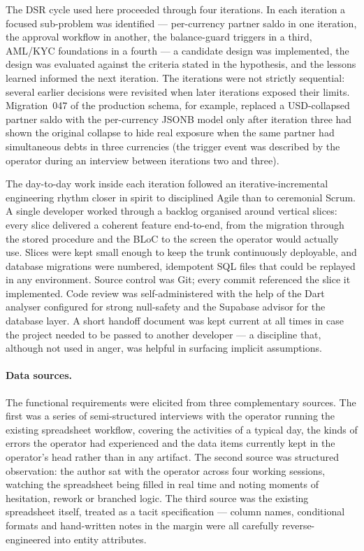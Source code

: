 The DSR cycle used here proceeded through four iterations. In each iteration a focused sub-problem was identified --- per-currency partner saldo in one iteration, the approval workflow in another, the balance-guard triggers in a third, AML/KYC foundations in a fourth --- a candidate design was implemented, the design was evaluated against the criteria stated in the hypothesis, and the lessons learned informed the next iteration. The iterations were not strictly sequential: several earlier decisions were revisited when later iterations exposed their limits. Migration~047 of the production schema, for example, replaced a USD-collapsed partner saldo with the per-currency JSONB model only after iteration three had shown the original collapse to hide real exposure when the same partner had simultaneous debts in three currencies (the trigger event was described by the operator during an interview between iterations two and three).

The day-to-day work inside each iteration followed an iterative-incremental engineering rhythm closer in spirit to disciplined Agile than to ceremonial Scrum. A single developer worked through a backlog organised around vertical slices: every slice delivered a coherent feature end-to-end, from the migration through the stored procedure and the BLoC to the screen the operator would actually use. Slices were kept small enough to keep the trunk continuously deployable, and database migrations were numbered, idempotent SQL files that could be replayed in any environment. Source control was Git; every commit referenced the slice it implemented. Code review was self-administered with the help of the Dart analyser configured for strong null-safety and the Supabase advisor for the database layer. A short handoff document was kept current at all times in case the project needed to be passed to another developer --- a discipline that, although not used in anger, was helpful in surfacing implicit assumptions.

\paragraph{Data sources.}
The functional requirements were elicited from three complementary sources. The first was a series of semi-structured interviews with the operator running the existing spreadsheet workflow, covering the activities of a typical day, the kinds of errors the operator had experienced and the data items currently kept in the operator's head rather than in any artifact. The second source was structured observation: the author sat with the operator across four working sessions, watching the spreadsheet being filled in real time and noting moments of hesitation, rework or branched logic. The third source was the existing spreadsheet itself, treated as a tacit specification --- column names, conditional formats and hand-written notes in the margin were all carefully reverse-engineered into entity attributes.

